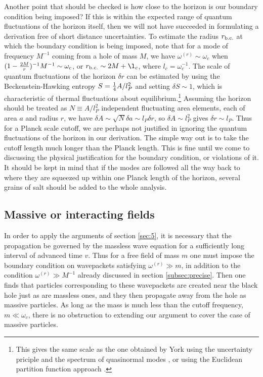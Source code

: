 \documentclass[12pt]{article}
\def\o{\omega}
\begin{document}
Another point that should be checked is how close to the horizon is
our boundary condition being imposed? If this is within the
expected range of quantum fluctuations of the horizon itself,
then we will not have succeeded in formulating a derivation
free of short distance uncertainties. To estimate the radius
$r_{\rm b.c.}$ at which the boundary condition is being imposed,
note that for a mode of frequency $M^{-1}$ coming from a hole of
mass $M$, we have $\o^{(r)}\sim\o_c$ when
$(1-{2M\over r})^{-1}M^{-1}\sim\o_c$, or
$r_{\rm b.c.}\sim 2M+ \l_c$, where $l_c=\o_c^{-1}$.
The scale of quantum fluctuations of
the horizon $\delta r$ can be estimated by using the Beckenstein-Hawking
entropy $S={1\over4} A/l_P^2$ and setting
$\delta S\sim 1$, which is characteristic of thermal
fluctuations about equilibrium.\footnote{This gives the same
scale as the one obtained by York using the
uncertainty priciple and the spectrum of quasinormal modes
\cite{York1}, or using the Euclidean partition
function approach \cite{York2}.}
Assuming the horizon should be treated as $N\equiv A/l_P^2$ independent
fluctuating area elements, each of area $a$ and radius $r$, we
have $\delta A\sim\sqrt{N}\delta a\sim l_P\delta r$,
so $\delta A\sim l_P^2$ gives $\delta r\sim l_P$.
Thus for a Planck scale cutoff, we are perhaps not justified
in ignoring the quantum fluctuations of the horizon in our derivation.
The simple way out is to take the cutoff length much longer than the
Planck length. This is fine until we come to discussing the
physical justification for the boundary condition, or violations
of it. It should be kept in mind that if the modes are followed all
the way back to where they are squeezed up within one Planck length of the
horizon, several grains of salt should be added to the whole analysis.

\subsection{Massive or interacting fields}
\label{subsec:interact}

In order to apply the arguments of section \ref{sec:5},
it is necessary that the propagation be governed by the
massless wave equation for a sufficiently long interval of
advanced time $v$. Thus
for a free field of mass $m$ one must impose the boundary
condition on wavepackets satisfying $\o^{(r)}\gg m$, in
addition to the condition $\o^{(r)}\gg M^{-1}$ already discussed
in section \ref{subsec:precise}. Then one finds that particles
corresponding to these wavepackets are created near the
black hole just as are massless ones, and they then propagate
away from the hole as massive particles. As long as the mass
is much less than the cutoff frequency, $m\ll\o_c$, there is
no obstruction to extending our argument to cover the case
of massive particles.
\end{document}
